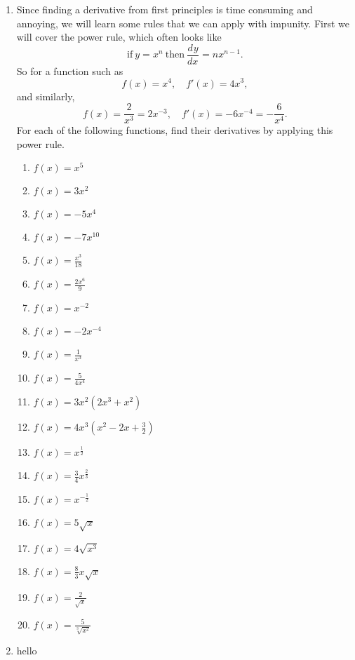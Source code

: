 \documentclass[a4paper,12pt]{article}
\newcommand{\deriv}[3][]{\frac{d^{#1}#2}{d#3^{#1}}}
\begin{document}
\begin{enumerate}
\item Since finding a derivative from first principles is time consuming and 
annoying, we will learn some rules that we can apply with impunity. First 
we will cover the power rule, which often looks like
$$\mathrm{if~} y = x^n \mathrm{~then~} \deriv{y}{x} = nx^{n - 1}.$$
So for a function such as 
$$f(x) = x^4,\quad f'(x) = 4x^3,$$
and similarly,
$$f(x) = \frac{2}{x^3} = 2x^{-3}, \quad f'(x) = -6x^{-4} = -\frac{6}{x^4}.$$
For each of the following functions, find their derivatives by applying 
this power rule.
    \begin{multicols}{2}
    \begin{enumerate}
    \item \rule[-1em]{0em}{3em}$f(x) = x^5$
    \item \rule[-1em]{0em}{3em}$f(x) = 3x^2$
    \item \rule[-1em]{0em}{3em}$f(x) = -5x^4$
    \item \rule[-1em]{0em}{3em}$f(x) = -7x^{10}$
    \item \rule[-1em]{0em}{3em}$f(x) = \frac{x^3}{18}$
    \item \rule[-1em]{0em}{3em}$f(x) = \frac{2x^6}{9}$
    \item \rule[-1em]{0em}{3em}$f(x) = x^{-2}$
    \item \rule[-1em]{0em}{3em}$f(x) = -2x^{-4}$
    \item \rule[-1em]{0em}{3em}$f(x) = \frac{1}{x^3}$
    \item \rule[-1em]{0em}{3em}$f(x) = \frac{5}{4x^4}$
    \item \rule[-1em]{0em}{3em}$f(x) = 3x^2(2x^3 + x^2)$
    \item \rule[-1em]{0em}{3em}$f(x) = 4x^3\left(x^2 - 2x + \frac{3}{2}\right)$
    \item \rule[-1em]{0em}{3em}$f(x) = x^{\frac{1}{2}}$
    \item \rule[-1em]{0em}{3em}$f(x) = \frac{3}{4}x^{\frac{2}{3}}$
    \item \rule[-1em]{0em}{3em}$f(x) = x^{-\frac{1}{2}}$
    \item \rule[-1em]{0em}{3em}$f(x) = 5\sqrt{x}$
    \item \rule[-1em]{0em}{3em}$f(x) = 4\sqrt{x^3}$
    \item \rule[-1em]{0em}{3em}$f(x) = \frac{8}{3}x\sqrt{x}$
    \item \rule[-1em]{0em}{3em}$f(x) = \frac{2}{\sqrt{x}}$
    \item \rule[-1em]{0em}{3em}$f(x) = \frac{5}{\sqrt[3]{x^2}}$
    \end{enumerate}
    \end{multicols}

\newpage
\item hello
\end{enumerate}
\newpage
\end{document}
